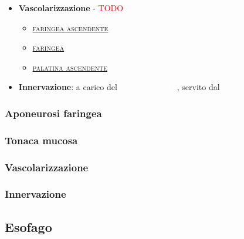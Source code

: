 \documentclass[italian,]{article}
\newcommand{\ner}[1]{\colorbox{Dandelion}{\textcolor{white}{\textsc{#1}}}}
\renewcommand{\a}[1]{\underline{\textsc{#1}}}
\newcommand{\TODO}[1]{\textcolor{red}{\textsf{\footnotesize{TODO #1}}}} %
\begin{document}
\begin{itemize}
\begin{itemize}
    \begin{itemize}
    \item
      \TODO{}
    \end{itemize}
  \end{itemize}
\item
  \textbf{Vascolarizzazione} - \TODO{}

  \begin{itemize}
  \item
    \a{faringea ascendente}
  \item
    \a{faringea}
  \item
    \a{palatina ascendente}
  \end{itemize}
\item
  \textbf{Innervazione}: a carico del \ner{plesso faringeo}, servito dal
  \ner{vago}
\end{itemize}

\hypertarget{aponeurosi-faringea}{%
\subsubsection{Aponeurosi faringea}\label{aponeurosi-faringea}}

\hypertarget{tonaca-mucosa}{%
\subsubsection{Tonaca mucosa}\label{tonaca-mucosa}}

\hypertarget{vascolarizzazione-1}{%
\subsubsection{Vascolarizzazione}\label{vascolarizzazione-1}}

\hypertarget{innervazione-2}{%
\subsubsection{Innervazione}\label{innervazione-2}}

\hypertarget{esofago}{%
\subsection{Esofago}\label{esofago}}
\end{document}
